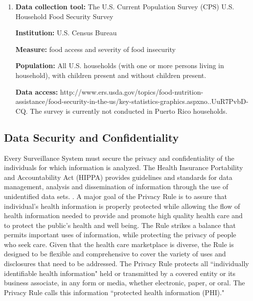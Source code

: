 \documentclass[12pt,letterpaper]{report}
\begin{document}
\begin{enumerate}
\item \textbf{Data collection tool:} The U.S. Current Population Survey (CPS) U.S. Household Food Security Survey

	\textbf{Institution:} U.S. Census Bureau

	\textbf{Measure:} food access and severity of food insecurity

	\textbf{Population:} All U.S. households (with one or more persons living in household), with children present and without children present. 

	\textbf{Data access:} http://www.ers.usda.gov/topics/food-nutrition-assistance/food-security-in-the-us/key-statistics-graphics.aspxno..UuR7PvbD-CQ.
The survey is currently not conducted in Puerto Rico households.

\end{enumerate}

 \subsection{Data Security and Confidentiality}

Every Surveillance System must secure the privacy and confidentiality of the individuals for which information is analyzed.  The Health Insurance Portability and Accountability Act (HIPPA) provides guidelines and standards for data management, analysis and dissemination of information through the use of unidentified data sets. \cite{act1996health}.  A major goal of the Privacy Rule is to assure that individual's health information is properly protected while allowing the flow of health information needed to provide and promote high quality health care and to protect the public's health and well being. The Rule strikes a balance that permits important uses of information, while protecting the privacy of people who seek care. Given that the health care marketplace is diverse, the Rule is designed to be flexible and comprehensive to cover the variety of uses and disclosures that need to be addressed. The Privacy Rule protects all ``individually identifiable health information" held or transmitted by a covered entity or its business associate, in any form or media, whether electronic, paper, or oral. The Privacy Rule calls this information ``protected health information (PHI)."
\end{document}
